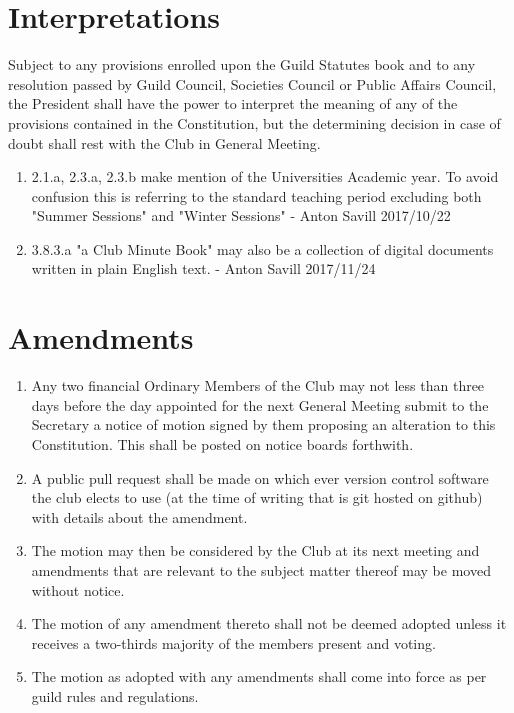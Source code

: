 \documentclass[10pt,a4paper]{report}
\begin{document}
	\section{Interpretations}
		Subject to any provisions enrolled upon the Guild Statutes book and to any resolution passed by Guild Council, Societies Council or Public Affairs Council, the President shall have the power to interpret the meaning of any of the provisions contained in the Constitution, but the determining decision in case of doubt shall rest with the Club in General Meeting.
		\begin{enumerate}[label=\arabic*]
			\item 2.1.a, 2.3.a, 2.3.b make mention of the Universities Academic year. To avoid confusion this is referring to the standard teaching period excluding both "Summer Sessions" and "Winter Sessions" - Anton Savill 2017/10/22
			\item 3.8.3.a "a Club Minute Book" may also be a collection of digital documents written in plain English text. - Anton Savill  2017/11/24
		\end{enumerate}

	\section{Amendments}
		\begin{enumerate}[label=\alph*]
			\item Any two financial Ordinary Members of the Club may not less than three days before the day appointed for the next General Meeting submit to the Secretary a notice of motion signed by them proposing an alteration to this Constitution. This shall be posted on notice boards forthwith.
			\item A public pull request shall be made on which ever version control software the club elects to use (at the time of writing that is git hosted on github) with details about the amendment.
			\item The motion may then be considered by the Club at its next meeting and amendments that are relevant to the subject matter thereof may be moved without notice.
			\item The motion of any amendment thereto shall not be deemed adopted unless it receives a two-thirds majority of the members present and voting.
			\item The motion as adopted with any amendments shall come into force as per guild rules and regulations.
		\end{enumerate}
\end{document}

